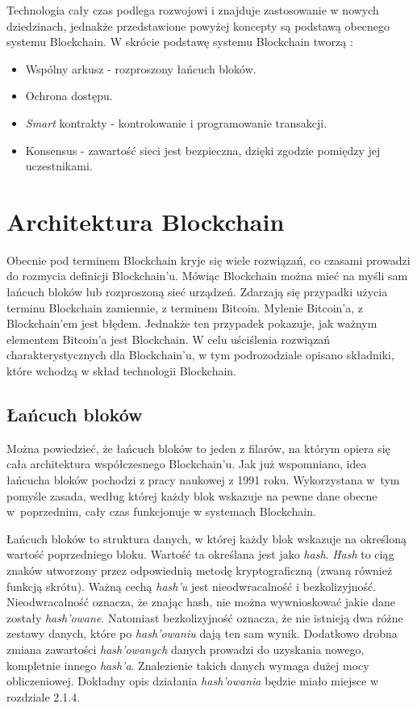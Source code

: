 \documentclass[a4paper,12pt]{book}
\begin{document}
Technologia cały czas podlega rozwojowi i znajduje zastosowanie w nowych dziedzinach, jednakże przedstawione powyżej koncepty są podstawą obecnego systemu Blockchain. W skrócie podstawę systemu Blockchain tworzą \cite{business}:
\begin{itemize}
	\item Wspólny arkusz - rozproszony łańcuch bloków.
	\item Ochrona dostępu.
	\item \textit{Smart} kontrakty - kontrolowanie i programowanie transakcji.
	\item Konsensus - zawartość sieci jest bezpieczna, dzięki zgodzie pomiędzy jej uczestnikami.
\end{itemize}

\section{Architektura Blockchain}

Obecnie pod terminem Blockchain kryje się wiele rozwiązań, co czasami prowadzi do rozmycia definicji Blockchain'u. Mówiąc Blockchain można mieć na myśli sam łańcuch bloków lub rozproszoną sieć urządzeń. Zdarzają się przypadki użycia terminu Blockchain zamiennie, z terminem Bitcoin\cite{bitcoin-vs-blockchain}. Mylenie Bitcoin'a, z Blockchain'em jest błędem. Jednakże ten przypadek pokazuje, jak ważnym elementem Bitcoin'a jest Blockchain. W celu uściślenia rozwiązań charakterystycznych dla Blockchain'u, w tym podrozodziale opisano składniki, które wchodzą w skład technologii Blockchain.

\subsection{Łańcuch bloków}

Można powiedzieć, że łańcuch bloków to jeden z filarów, na którym opiera się cała architektura współczesnego Blockchain'u. Jak już wspomniano, idea łańcucha bloków pochodzi z pracy naukowej z 1991 roku. Wykorzystana w~tym pomyśle zasada, według której każdy blok wskazuje na pewne dane obecne w~poprzednim, cały czas funkcjonuje w systemach Blockchain.

Łańcuch bloków to struktura danych, w której każdy blok wskazuje na określoną wartość poprzedniego bloku. Wartość ta określana jest jako \textit{hash}. \textit{Hash} to ciąg znaków utworzony przez odpowiednią metodę kryptograficzną (zwaną również funkcją skrótu). Ważną cechą \textit{hash'u} jest nieodwracalność i bezkolizyjność. Nieodwracalność oznacza, że znając hash, nie można wywnioskować jakie dane zostały \textit{hash'owane}. Natomiast bezkolizyjność oznacza, że nie istnieją dwa różne zestawy danych, które po \textit{hash'owaniu} dają ten sam wynik. Dodatkowo drobna zmiana zawartości \textit{hash'owanych} danych prowadzi do uzyskania nowego, kompletnie innego \textit{hash'a}. Znalezienie takich danych wymaga dużej mocy obliczeniowej\cite{hash}. Dokładny opis działania \textit{hash'owania} będzie miało miejsce w rozdziale 2.1.4.
\end{document}
